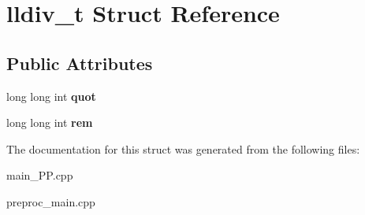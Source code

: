 \hypertarget{structlldiv__t}{\section{lldiv\+\_\+t Struct Reference}
\label{structlldiv__t}
}
\subsection*{Public Attributes}
\begin{DoxyCompactItemize}
\item 
\hypertarget{structlldiv__t_aa2c189bf2a4ebe0f680463e4ce32b72f}{long long int {\bfseries quot}}\label{structlldiv__t_aa2c189bf2a4ebe0f680463e4ce32b72f}

\item 
\hypertarget{structlldiv__t_adc99c61028a27673c373ab2815f90a79}{long long int {\bfseries rem}}\label{structlldiv__t_adc99c61028a27673c373ab2815f90a79}

\end{DoxyCompactItemize}


The documentation for this struct was generated from the following files\+:\begin{DoxyCompactItemize}
\item 
main\+\_\+\+P\+P.\+cpp\item 
preproc\+\_\+main.\+cpp\end{DoxyCompactItemize}
